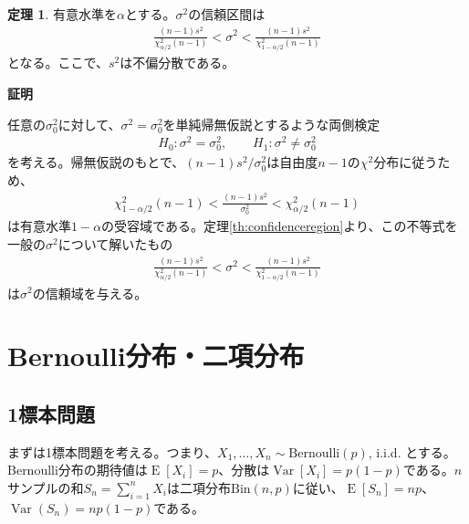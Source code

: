\documentclass[11pt]{ltjsarticle}
\makeatletter
\theoremstyle{definition}
\newtheorem{theorem}{定理}[section]
\DeclareMathOperator{\E}{E}
\DeclareMathOperator{\Var}{Var}
\renewenvironment{proof}[1][証明]{\par
  \pushQED{\qed}%
  \normalfont \topsep6\p@\@plus6\p@\relax
  \trivlist
  \item\relax
  {\bfseries
  #1\@addpunct{.}}\hspace\labelsep\ignorespaces
}{%
  \popQED\endtrivlist\@endpefalse
}
\makeatother
\begin{document}
\begin{theorem}
    有意水準を$\alpha$とする。$\sigma^2$の信頼区間は
    \begin{align}
        \frac{(n-1)s^2}{\chi^2_{\alpha/2}(n-1)} < \sigma^2 < \frac{(n-1)s^2}{\chi^2_{1-\alpha/2}(n-1)}
    \end{align}
    となる。ここで、$s^2$は不偏分散である。
\end{theorem}
\begin{proof}
    任意の$\sigma_0^2$に対して、$\sigma^2=\sigma^2_0$を単純帰無仮説とするような両側検定
    \begin{align}\label{sigmatest}
            H_0: \sigma^2=\sigma^2_0,\qquad H_1: \sigma^2\neq \sigma^2_0
    \end{align}
    を考える。帰無仮説のもとで、$(n-1)s^2/\sigma_0^2$は自由度$n-1$の$\chi^2$分布に従うため、
    \begin{align}
        \chi_{1-\alpha/2}^2(n-1) < \frac{(n-1)s^2}{\sigma_0^2} < \chi_{\alpha/2}^2(n-1)
    \end{align}
    は有意水準$1-\alpha$の受容域である。定理\ref{th:confidenceregion}より、この不等式を一般の$\sigma^2$について解いたもの
    \begin{align}
        \frac{(n-1)s^2}{\chi^2_{\alpha/2}(n-1)} < \sigma^2 < \frac{(n-1)s^2}{\chi^2_{1-\alpha/2}(n-1)}
    \end{align}
    は$\sigma^2$の信頼域を与える。
\end{proof}

\section{Bernoulli分布・二項分布}
\subsection{1標本問題}
まずは1標本問題を考える。つまり、$X_1,\ldots, X_n\sim \text{Bernoulli}(p)$, i.i.d. とする。Bernoulli分布の期待値は$\E[X_i]=p$、分散は$\Var[X_i]=p(1-p)$である。$n$サンプルの和$S_n=\sum_{i=1}^nX_i$は二項分布$\text{Bin}(n, p)$に従い、$\E[S_n]=np$、$\Var(S_n)=np(1-p)$である。
\end{document}
